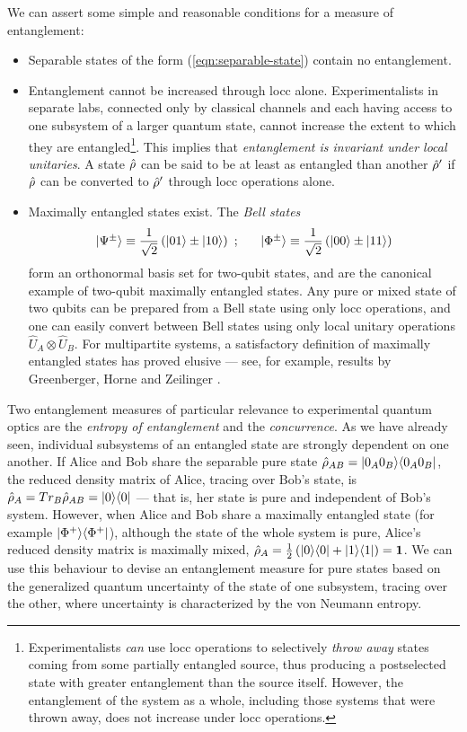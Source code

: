 We can assert some simple and reasonable conditions for a measure of entanglement: 
\begin{itemize}
\item Separable states of the form (\ref{eqn:separable-state}) contain no entanglement.
\item Entanglement cannot be increased through \gls{locc} alone. Experimentalists in separate labs, connected only by classical channels and each having access to one subsystem of a larger quantum state, cannot increase the extent to which they are entangled\footnote{Experimentalists \emph{can} use \gls{locc} operations to selectively \emph{throw away} states coming from some partially entangled source, thus producing a postselected state with greater entanglement than the source itself. However, the entanglement of the system as a whole, including those systems that were thrown away, does not increase under \gls{locc} operations.}. 
This implies that \emph{entanglement is invariant under local unitaries}.  A state $\hat{\rho}$ can be said to be at least as entangled than another $\hat{\rho}'$ if $\hat{\rho}$ can be converted to $\hat{\rho}'$ through \gls{locc} operations alone.
\item Maximally entangled states exist. The \emph{Bell states}
\begin{equation}
\mbox{$ | \Psi^{\pm} \rangle $} \equiv \frac{1}{\sqrt{2}} \left( \mbox{$ | 01 \rangle $} \pm \mbox{$ | 10 \rangle $} \right)~;~~~~~
\mbox{$ | \Phi^{\pm} \rangle $} \equiv \frac{1}{\sqrt{2}} \left( \mbox{$ | 00 \rangle $} \pm \mbox{$ | 11 \rangle $} \right) 
\label{eqn:bell-states}
\end{equation}
form an orthonormal basis set for two-qubit states, and are the canonical example of two-qubit maximally entangled states.
Any pure or mixed state of two qubits can be prepared from a Bell state using only \gls{locc} operations, and one can easily convert between Bell states using only local unitary operations $\hat{U}_A \otimes \hat{U}_B$.
For multipartite systems, a satisfactory definition of maximally entangled states has proved elusive --- see, for example, results by Greenberger, Horne and Zeilinger \cite{Greenberger1990}.
\end{itemize}

Two entanglement measures of particular relevance to experimental quantum optics are the  \emph{entropy of entanglement} and the \emph{concurrence}. 
As we have already seen, individual subsystems of an entangled state are strongly dependent on one another.
If Alice and Bob share the separable pure state $\hat{\rho}_{AB} = \mbox{$ | 0_A0_B \rangle $}\mbox{$ \langle 0_A0_B | $}$, the reduced density matrix of Alice, tracing over Bob's state, is $\hat{\rho}_{A} = Tr_B \hat{\rho}_{AB} = \mbox{$ | 0 \rangle $}\mbox{$ \langle 0 | $}$ --- that is, her state is pure and independent of Bob's system.
However, when Alice and Bob share a maximally entangled state (for example $\mbox{$ | \Phi^+ \rangle $}\mbox{$ \langle \Phi^+ | $}$), although the state of the whole system is pure,  Alice's reduced density matrix is maximally mixed, $\hat{\rho}_{A} = \frac{1}{2}\left(\mbox{$ | 0 \rangle $}\mbox{$ \langle 0 | $} + \mbox{$ | 1 \rangle $}\mbox{$ \langle 1 | $}\right) = \mathbf{1}$. 
We can use this behaviour to devise an entanglement measure for pure states based on the generalized quantum uncertainty of the state of one subsystem, tracing over the other, where uncertainty is characterized by the von Neumann entropy. 

